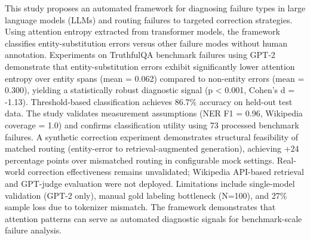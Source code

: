 
This study proposes an automated framework for diagnosing failure types in large language models (LLMs) and routing failures to targeted correction strategies. Using attention entropy extracted from transformer models, the framework classifies entity-substitution errors versus other failure modes without human annotation. Experiments on TruthfulQA benchmark failures using GPT-2 demonstrate that entity-substitution errors exhibit significantly lower attention entropy over entity spans (mean = 0.062) compared to non-entity errors (mean = 0.300), yielding a statistically robust diagnostic signal (p < 0.001, Cohen's d = -1.13). Threshold-based classification achieves 86.7\% accuracy on held-out test data. The study validates measurement assumptions (NER F1 = 0.96, Wikipedia coverage = 1.0) and confirms classification utility using 73 processed benchmark failures. A synthetic correction experiment demonstrates structural feasibility of matched routing (entity-error to retrieval-augmented generation), achieving +24 percentage points over mismatched routing in configurable mock settings. Real-world correction effectiveness remains unvalidated; Wikipedia API-based retrieval and GPT-judge evaluation were not deployed. Limitations include single-model validation (GPT-2 only), manual gold labeling bottleneck (N=100), and 27\% sample loss due to tokenizer mismatch. The framework demonstrates that attention patterns can serve as automated diagnostic signals for benchmark-scale failure analysis.
